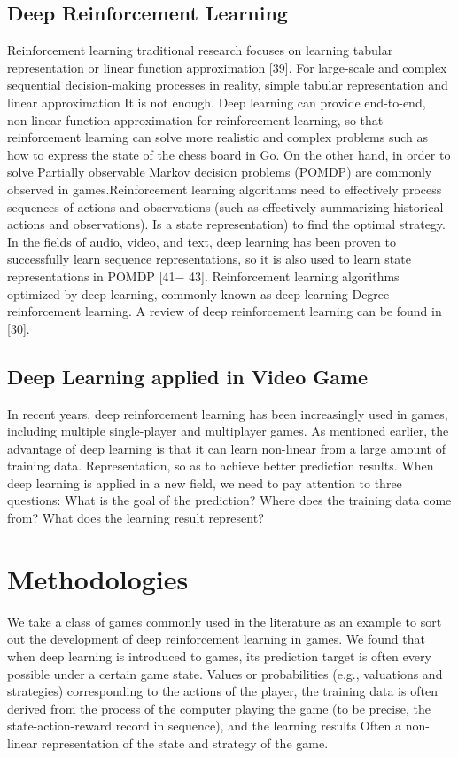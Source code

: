 \documentclass[11pt,en]{elegantpaper}
\begin{document}
\subsection{Deep Reinforcement Learning}
Reinforcement learning traditional research focuses on learning tabular representation or linear function approximation [39]. For large-scale and complex sequential decision-making processes in reality, simple tabular representation and linear approximation It is not enough. Deep learning can provide end-to-end, non-linear function approximation for reinforcement learning, so that reinforcement learning can solve more realistic and complex problems such as how to express the state of the chess board in Go. On the other hand, in order to solve Partially observable Markov decision problems (POMDP) ​​are commonly observed in games.Reinforcement learning algorithms need to effectively process sequences of actions and observations (such as effectively summarizing historical actions and observations). Is a state representation) to find the optimal strategy. In the fields of audio, video, and text, deep learning has been proven to successfully learn sequence representations, so it is also used to learn state representations in POMDP [41− 43]. Reinforcement learning algorithms optimized by deep learning, commonly known as deep learning Degree reinforcement learning. A review of deep reinforcement learning can be found in [30].

\subsection{Deep Learning applied in Video Game}
In recent years, deep reinforcement learning has been increasingly used in games, including multiple single-player and multiplayer games. As mentioned earlier, the advantage of deep learning is that it can learn non-linear from a large amount of training data. Representation, so as to achieve better prediction results. When deep learning is applied in a new field, we need to pay attention to three questions: What is the goal of the prediction? Where does the training data come from? What does the learning result represent?


\section{Methodologies}
We take a class of games commonly used in the literature as an example to sort out the development of deep reinforcement learning in games. We found that when deep learning is introduced to games, its prediction target is often every possible under a certain game state. Values or probabilities (e.g., valuations and strategies) corresponding to the actions of the player, the training data is often derived from the process of the computer playing the game (to be precise, the state-action-reward record in sequence), and the learning results Often a non-linear representation of the state and strategy of the game.
\end{document}
